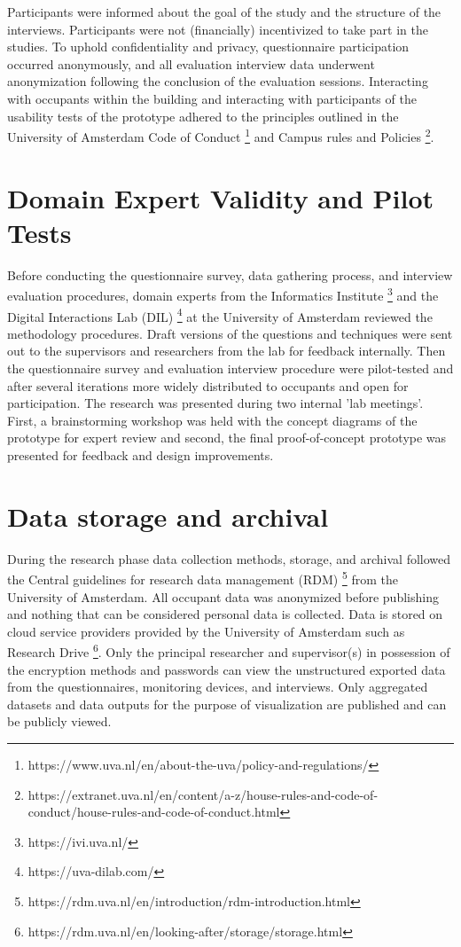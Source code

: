 \begin{appendices}
Participants were informed about the goal of the study and the structure of the interviews. Participants were not (financially) incentivized to take part in the studies. To uphold confidentiality and privacy, questionnaire participation occurred anonymously, and all evaluation interview data underwent anonymization following the conclusion of the evaluation sessions. Interacting with occupants within the building and interacting with participants of the usability tests of the prototype adhered to the principles outlined in the University of Amsterdam Code of Conduct \footnote{https://www.uva.nl/en/about-the-uva/policy-and-regulations/} and Campus rules and Policies \footnote{https://extranet.uva.nl/en/content/a-z/house-rules-and-code-of-conduct/house-rules-and-code-of-conduct.html}.

\section{Domain Expert Validity and Pilot Tests}
\label{appendix:experts}

Before conducting the questionnaire survey, data gathering process, and interview evaluation procedures, domain experts from the Informatics Institute \footnote{https://ivi.uva.nl/} and the Digital Interactions Lab (DIL) \footnote{https://uva-dilab.com/} at the University of Amsterdam reviewed the methodology procedures. Draft versions of the questions and techniques were sent out to the supervisors and researchers from the lab for feedback internally. Then the questionnaire survey and evaluation interview procedure were pilot-tested and after several iterations more widely distributed to occupants and open for participation. The research was presented during two internal 'lab meetings'. First, a brainstorming workshop was held with the concept diagrams of the prototype for expert review and second, the final proof-of-concept prototype was presented for feedback and design improvements. 

\section{Data storage and archival}
\label{appendix:data}

During the research phase data collection methods, storage, and archival followed the Central guidelines for research data management (RDM) \footnote{https://rdm.uva.nl/en/introduction/rdm-introduction.html} from the University of Amsterdam. All occupant data was anonymized before publishing and nothing that can be considered personal data is collected. Data is stored on cloud service providers provided by the University of Amsterdam such as Research Drive \footnote{https://rdm.uva.nl/en/looking-after/storage/storage.html}. Only the principal researcher and supervisor(s) in possession of the encryption methods and passwords can view the unstructured exported data from the questionnaires, monitoring devices, and interviews. Only aggregated datasets and data outputs for the purpose of visualization are published and can be publicly viewed.


\end{appendices}
